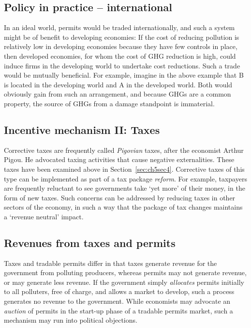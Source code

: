 \newhtmlpage

\subsection*{Policy in practice -- international}

In an ideal world, permits would be traded internationally, and such a
system might be of benefit to developing economies: If the cost of reducing
pollution is relatively low in developing economies because they have few
controls in place, then developed economies, for whom the cost of GHG
reduction is high, could induce firms in the developing world to undertake
cost reductions. Such a trade would be mutually beneficial. For example,
imagine in the above example that B is located in the developing world and A
in the developed world. Both would obviously gain from such an arrangement,
and because GHGs are a common property, the source of GHGs from a damage
standpoint is immaterial.

\subsection*{Incentive mechanism II: Taxes}

Corrective taxes are frequently called \textit{Pigovian} taxes, after the
economist Arthur Pigou. He advocated taxing activities that cause negative
externalities. These taxes have been examined above in Section~\ref{sec:ch5sec4}.
Corrective taxes of this type can be implemented as part of
a tax package \textit{reform}. For example, taxpayers are frequently
reluctant to see governments take `yet more' of their money, in the form of
new taxes. Such concerns can be addressed by reducing taxes in other sectors
of the economy, in such a way that the package of tax changes maintains a
`revenue neutral' impact.

\newhtmlpage

\subsection*{Revenues from taxes and permits}

Taxes and tradable permits differ in that taxes generate revenue for the
government from polluting producers, whereas permits may not generate
revenue, or may generate less revenue. If the government simply \textit{%
allocates} permits initially to all polluters, free of charge, and allows a
market to develop, such a process generates no revenue to the government.
While economists may advocate an \textit{auction} of permits in the start-up
phase of a tradable permits market, such a mechanism may run into political
objections.

